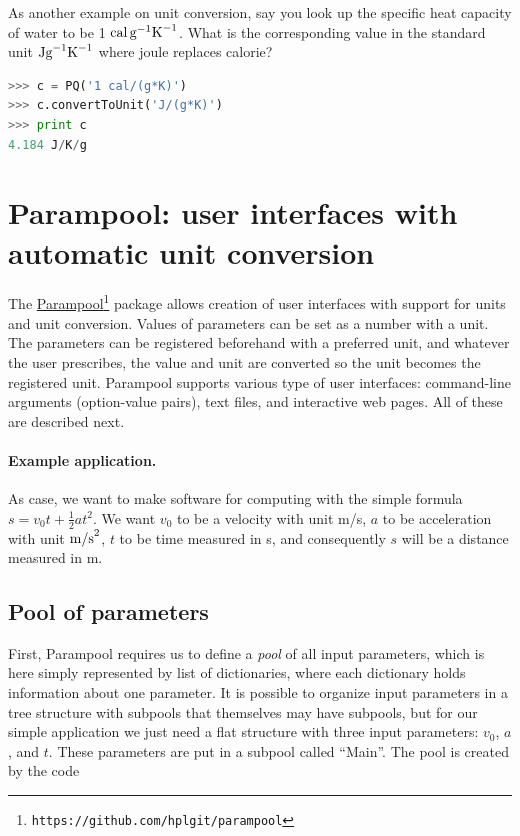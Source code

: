 \documentclass[graybox,envcountchap,sectrefs,final]{svmonodo}
\begin{document}
As another example on unit conversion,
say you look up the specific heat capacity of water to
be 1 $\hbox{cal}\, \hbox{g}^{-1}\hbox{K}^{-1}$. What is the
corresponding value in the standard unit $\hbox{Jg}^{-1}\hbox{K}^{-1}$
where joule replaces calorie?

\begin{lstlisting}[language=Python,style=graycolor]
>>> c = PQ('1 cal/(g*K)')
>>> c.convertToUnit('J/(g*K)')
>>> print c
4.184 J/K/g
\end{lstlisting}

\section{Parampool: user interfaces with automatic unit conversion}
\label{scale:parampool}


The \href{{https://github.com/hplgit/parampool}}{Parampool}\footnote{\texttt{https://github.com/hplgit/parampool}} package allows
creation of user interfaces with support for units and unit
conversion. Values of parameters can be set as a number with a
unit. The parameters can be registered beforehand with a preferred
unit, and whatever the user prescribes, the value and unit are
converted so the unit becomes the registered unit. Parampool supports
various type of user interfaces: command-line arguments (option-value
pairs), text files, and interactive web pages. All of these
are described next.

\paragraph{Example application.}
As case, we want to make software for computing with the simple
formula $s=v_0t + \frac{1}{2}at^2$. We want $v_0$ to be a velocity
with unit m/s, $a$ to be acceleration with unit $\hbox{m/s}^2$, $t$ to be
time measured in s, and consequently $s$ will be a distance measured in m.

\subsection{Pool of parameters}

First, Parampool requires us to define a \emph{pool} of all input
parameters, which is here simply represented by list of dictionaries, where each
dictionary holds information about one parameter. It is possible to
organize input parameters in a tree structure with subpools that
themselves may have
subpools,
but for our simple application we just need a flat structure with
three input parameters:
$v_0$, $a$, and $t$. These parameters are put in a subpool called
``Main''. The pool is created by the code
\end{document}
